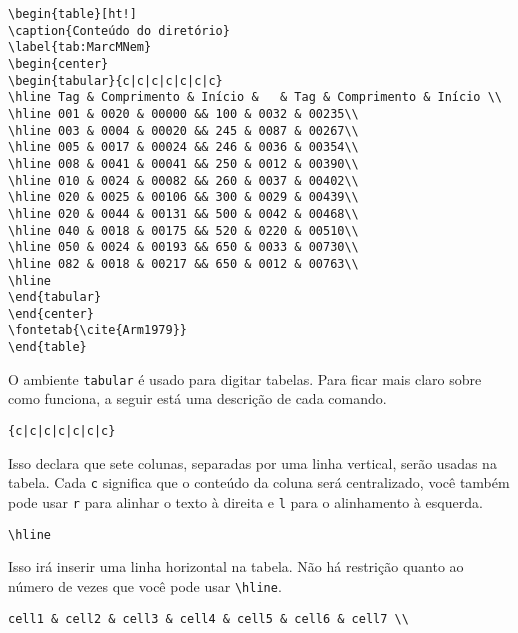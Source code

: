 \begin{verbatim}
\begin{table}[ht!]
\caption{Conteúdo do diretório}
\label{tab:MarcMNem} 
\begin{center}
\begin{tabular}{c|c|c|c|c|c|c}
\hline Tag & Comprimento & Início &   & Tag & Comprimento & Início \\ 
\hline 001 & 0020 & 00000 && 100 & 0032 & 00235\\ 
\hline 003 & 0004 & 00020 && 245 & 0087 & 00267\\ 
\hline 005 & 0017 & 00024 && 246 & 0036 & 00354\\ 
\hline 008 & 0041 & 00041 && 250 & 0012 & 00390\\ 
\hline 010 & 0024 & 00082 && 260 & 0037 & 00402\\ 
\hline 020 & 0025 & 00106 && 300 & 0029 & 00439\\ 
\hline 020 & 0044 & 00131 && 500 & 0042 & 00468\\ 
\hline 040 & 0018 & 00175 && 520 & 0220 & 00510\\ 
\hline 050 & 0024 & 00193 && 650 & 0033 & 00730\\ 
\hline 082 & 0018 & 00217 && 650 & 0012 & 00763\\ 
\hline 
\end{tabular} 
\end{center}
\fontetab{\cite{Arm1979}}
\end{table}
\end{verbatim}

O ambiente \verb|tabular| é usado para digitar tabelas. Para ficar mais claro sobre como funciona, a seguir está uma descrição de cada comando.

\begin{verbatim}
{c|c|c|c|c|c|c}
\end{verbatim}

Isso declara que sete colunas, separadas por uma linha vertical, serão usadas na tabela. Cada \verb|c| significa que o conteúdo da coluna será centralizado, você também pode usar \verb|r| para alinhar o texto à direita e \verb|l| para o alinhamento à esquerda.

\begin{verbatim}
\hline
\end{verbatim}

Isso irá inserir uma linha horizontal na tabela. Não há restrição quanto ao número de vezes que você pode usar \verb|\hline|.

\begin{verbatim}
cell1 & cell2 & cell3 & cell4 & cell5 & cell6 & cell7 \\
\end{verbatim}

